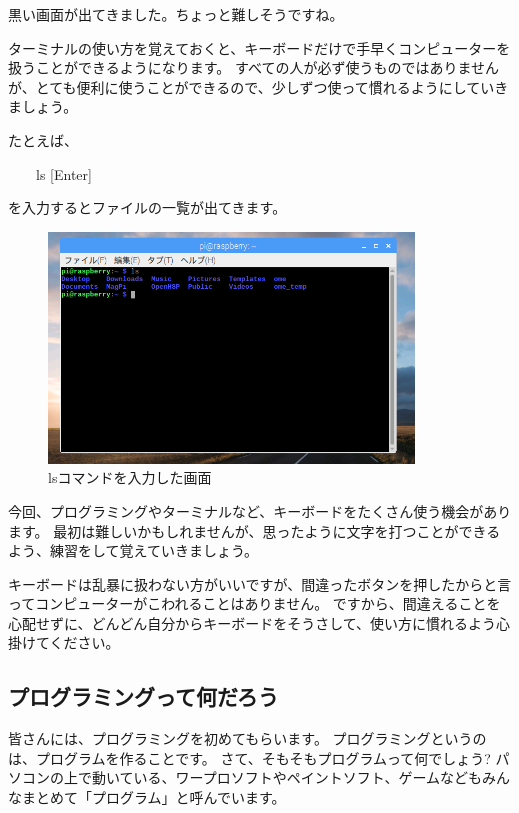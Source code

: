 \noindent
黒い画面が出てきました。ちょっと難しそうですね。

ターミナルの使い方を覚えておくと、キーボードだけで手早くコンピューターを扱うことができるようになります。
すべての人が必ず使うものではありませんが、とても便利に使うことができるので、少しずつ使って慣れるようにしていきましょう。

\noindent
たとえば、

\vspace{1em}
\ \ \ \ ls [Enter]
\vspace{1em}
  
\noindent
を入力するとファイルの一覧が出てきます。

\begin{figure}[H]
  \begin{center}
    \includegraphics[width=9.71cm,height=6.138cm]{images/chap02/text02-img005.png}
    \caption{lsコマンドを入力した画面}
  \end{center}
  \label{fig:terminal_ls}
\end{figure}

今回、プログラミングやターミナルなど、キーボードをたくさん使う機会があります。
最初は難しいかもしれませんが、思ったように文字を打つことができるよう、練習をして覚えていきましょう。

キーボードは乱暴に扱わない方がいいですが、間違ったボタンを押したからと言ってコンピューターがこわれることはありません。
ですから、間違えることを心配せずに、どんどん自分からキーボードをそうさして、使い方に慣れるよう心掛けてください。

% 
% 
% 
\subsection{プログラミングって何だろう}

皆さんには、プログラミングを初めてもらいます。
プログラミングというのは、プログラムを作ることです。
さて、そもそもプログラムって何でしょう?
パソコンの上で動いている、ワープロソフトやペイントソフト、ゲームなどもみんなまとめて「プログラム」と呼んでいます。

